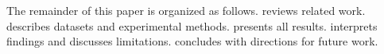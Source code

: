 The remainder of this paper is organized as follows.   reviews
related work.   describes datasets and experimental methods.
 presents all results.   interprets findings
and discusses limitations.   concludes with directions for future
work.
